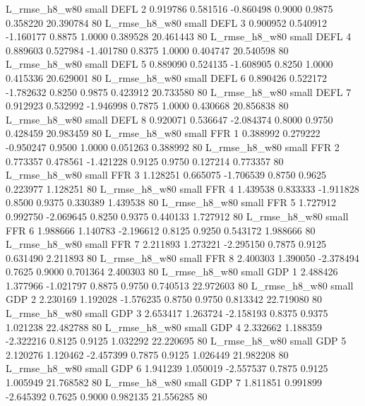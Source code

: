  L_rmse_h8_w80      small     DEFL                 2 0.919786 0.581516 -0.860498 0.9000 0.9875  0.358220   20.390784 80
 L_rmse_h8_w80      small     DEFL                 3 0.900952 0.540912 -1.160177 0.8875 1.0000  0.389528   20.461443 80
 L_rmse_h8_w80      small     DEFL                 4 0.889603 0.527984 -1.401780 0.8375 1.0000  0.404747   20.540598 80
 L_rmse_h8_w80      small     DEFL                 5 0.889090 0.524135 -1.608905 0.8250 1.0000  0.415336   20.629001 80
 L_rmse_h8_w80      small     DEFL                 6 0.890426 0.522172 -1.782632 0.8250 0.9875  0.423912   20.733580 80
 L_rmse_h8_w80      small     DEFL                 7 0.912923 0.532992 -1.946998 0.7875 1.0000  0.430668   20.856838 80
 L_rmse_h8_w80      small     DEFL                 8 0.920071 0.536647 -2.084374 0.8000 0.9750  0.428459   20.983459 80
 L_rmse_h8_w80      small      FFR                 1 0.388992 0.279222 -0.950247 0.9500 1.0000  0.051263    0.388992 80
 L_rmse_h8_w80      small      FFR                 2 0.773357 0.478561 -1.421228 0.9125 0.9750  0.127214    0.773357 80
 L_rmse_h8_w80      small      FFR                 3 1.128251 0.665075 -1.706539 0.8750 0.9625  0.223977    1.128251 80
 L_rmse_h8_w80      small      FFR                 4 1.439538 0.833333 -1.911828 0.8500 0.9375  0.330389    1.439538 80
 L_rmse_h8_w80      small      FFR                 5 1.727912 0.992750 -2.069645 0.8250 0.9375  0.440133    1.727912 80
 L_rmse_h8_w80      small      FFR                 6 1.988666 1.140783 -2.196612 0.8125 0.9250  0.543172    1.988666 80
 L_rmse_h8_w80      small      FFR                 7 2.211893 1.273221 -2.295150 0.7875 0.9125  0.631490    2.211893 80
 L_rmse_h8_w80      small      FFR                 8 2.400303 1.390050 -2.378494 0.7625 0.9000  0.701364    2.400303 80
 L_rmse_h8_w80      small      GDP                 1 2.488426 1.377966 -1.021797 0.8875 0.9750  0.740513   22.972603 80
 L_rmse_h8_w80      small      GDP                 2 2.230169 1.192028 -1.576235 0.8750 0.9750  0.813342   22.719080 80
 L_rmse_h8_w80      small      GDP                 3 2.653417 1.263724 -2.158193 0.8375 0.9375  1.021238   22.482788 80
 L_rmse_h8_w80      small      GDP                 4 2.332662 1.188359 -2.322216 0.8125 0.9125  1.032292   22.220695 80
 L_rmse_h8_w80      small      GDP                 5 2.120276 1.120462 -2.457399 0.7875 0.9125  1.026449   21.982208 80
 L_rmse_h8_w80      small      GDP                 6 1.941239 1.050019 -2.557537 0.7875 0.9125  1.005949   21.768582 80
 L_rmse_h8_w80      small      GDP                 7 1.811851 0.991899 -2.645392 0.7625 0.9000  0.982135   21.556285 80
